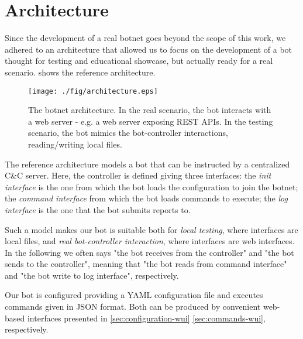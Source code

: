 \section{Architecture}
\label{sec:architecture}

Since the development of a real botnet goes beyond the scope of this work, we adhered to an architecture that allowed us to focus on the development of a bot thought for testing and educational showcase, but actually ready for a real scenario.  shows the reference architecture.

\begin{figure}[tp]
  \centering
  \texttt{[image: ./fig/architecture.eps]}
  \caption{The botnet architecture. In the real scenario, the bot interacts with a web server - e.g. a web server exposing REST APIs. In the testing scenario, the bot mimics the bot-controller interactions, reading/writing local files.}
    \label{fig:botnet-architecture}
\end{figure}

The reference architecture models a bot that can be instructed by a centralized C\&C server.
Here, the controller is defined giving three interfaces: the \textit{init interface} is the one from which the bot loads the configuration to join the botnet; the \textit{command interface} from which the bot loads commands to execute; the \textit{log interface} is the one that the bot submits reports to.

Such a model makes our bot is suitable both for \textit{local testing}, where interfaces are local files, and \textit{real bot-controller interaction}, where interfaces are web interfaces. In the following we often says "the bot receives from the controller" and "the bot sends to the controller", meaning that "the bot reads from command interface" and "the bot write to log interface", respectively.

Our bot is configured providing a YAML configuration file and executes commands given in JSON format. Both can be produced by convenient web-based interfaces presented in \ref{sec:configuration-wui} \ref{sec:commands-wui}, respectively.
